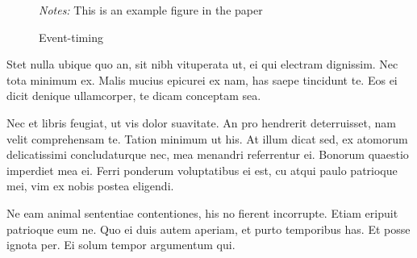 \documentclass[12pt]{article}
\begin{document}
\begin{figure}
  \caption{Event-timing}

  \begin{adjustbox}{center}

  \end{adjustbox}
  {\footnotesize \emph{Notes:} This is an example figure in the paper}
\end{figure}

Stet nulla ubique quo an, sit nibh vituperata ut, ei qui electram dignissim. Nec tota minimum ex. Malis mucius epicurei ex nam, has saepe tincidunt te. Eos ei dicit denique ullamcorper, te dicam conceptam sea.

Nec et libris feugiat, ut vis dolor suavitate. An pro hendrerit deterruisset, nam velit comprehensam te. Tation minimum ut his. At illum dicat sed, ex atomorum delicatissimi concludaturque nec, mea menandri referrentur ei. Bonorum quaestio imperdiet mea ei. Ferri ponderum voluptatibus ei est, cu atqui paulo patrioque mei, vim ex nobis postea eligendi.

Ne eam animal sententiae contentiones, his no fierent incorrupte. Etiam eripuit patrioque eum ne. Quo ei duis autem aperiam, et purto temporibus has. Et posse ignota per. Ei solum tempor argumentum qui.
\end{document}
